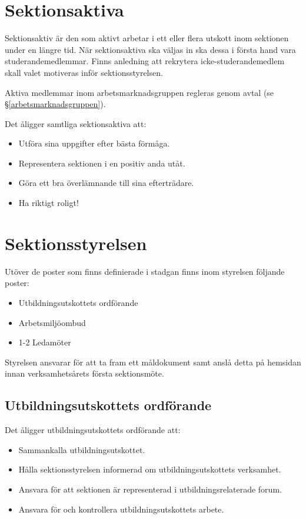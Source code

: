 \documentclass{datateknologsektionen-document}
\begin{document}
\section{Sektionsaktiva}
Sektionsaktiv är den som aktivt arbetar i ett eller flera utskott inom sektionen under en längre tid.
När sektionsaktiva ska väljas in ska dessa i första hand vara studerandemedlemmar.
Finns anledning att rekrytera icke-studerandemedlem skall valet motiveras inför
sektionsstyrelsen.

Aktiva medlemmar inom arbetsmarknadsgruppen regleras genom avtal (se \S \ref{arbetsmarknadsgruppen}).

Det åligger samtliga sektionsaktiva att:
\begin{itemize}
  \item Utföra sina uppgifter efter bästa förmåga.
  \item Representera sektionen i en positiv anda utåt.
  \item Göra ett bra överlämnande till sina efterträdare.
  \item Ha riktigt roligt!
\end{itemize}

\section{Sektionsstyrelsen}
Utöver de poster som finns definierade i stadgan finns inom styrelsen följande poster:
\begin{itemize}
  \item Utbildningsutskottets ordförande
  \item Arbetsmiljöombud
  \item 1-2 Ledamöter
\end{itemize}

Styrelsen ansvarar för att ta fram ett måldokument samt anslå detta på hemsidan
innan verksamhetsårets första sektionsmöte.

\subsection{Utbildningsutskottets ordförande}
\label{utbuordf}
Det åligger utbildningsutskottets ordförande att:
\begin{itemize}
  \item Sammankalla utbildningsutskottet.
  \item Hålla sektionsstyrelsen informerad om utbildningsutskottets verksamhet.
  \item Ansvara för att sektionen är representerad i utbildningsrelaterade forum.
  \item Ansvara för och kontrollera utbildningsutskottets arbete.
\end{itemize}
\end{document}
